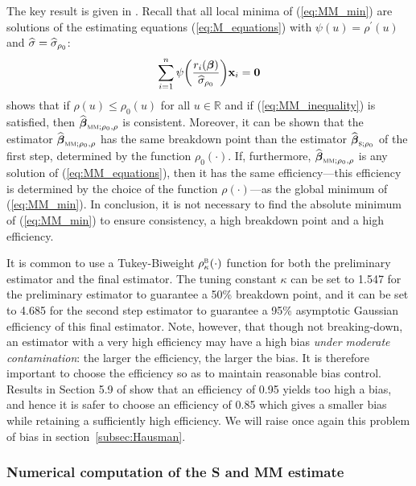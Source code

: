 The key result is given in \citet{yohai:1987}. Recall that all local minima of
(\ref{eq:MM_min}) are solutions of the estimating equations
(\ref{eq:M_equations}) with $\psi(u) = \rho^{\prime}(u)$ and $\widehat{\sigma} =
\widehat{\sigma}_{\rho_{0}}$:
%
\begin{equation}\label{eq:MM_equations}
    \sum_{i=1}^{n} \psi\left(\frac{r_{i}(\boldsymbol\beta)}{\sthat{\sigma}_{\rho_{0}}}\right)
    \stvec{x}_{i} = \stvec{0}
\end{equation}
%
\citeauthor{yohai:1987} shows that if $\rho(u) \leq \rho_{0}(u)$ for all $u \in
\mathbb{R}$ and if (\ref{eq:MM_inequality}) is satisfied, then
$\sthat{\boldsymbol\beta}_{\stsc{MM};\rho_{0},\rho}$ is consistent. Moreover,
it can be shown that the  estimator
$\sthat{\boldsymbol\beta}_{\stsc{MM};\rho_{0},\rho}$ has the same breakdown
point than the  estimator
$\sthat{\boldsymbol\beta}_{\stsc{S};\rho_{0}}$ of the first step, determined by
the function $\rho_{0}(\cdot)$. If, furthermore,
$\sthat{\boldsymbol\beta}_{\stsc{MM};\rho_{0},\rho}$ is any solution of
(\ref{eq:MM_equations}), then it has the same efficiency---this efficiency is
determined by the choice of the function $\rho(\cdot)$---as the global minimum
of (\ref{eq:MM_min}). In conclusion, it is not necessary to find the absolute
minimum of (\ref{eq:MM_min}) to ensure consistency, a high breakdown point and
a high efficiency.

It is common to use a Tukey-Biweight $\rho_{\kappa}^{\stsc{B}}(\cdot)$ function
for both the preliminary  estimator and the final  estimator.
The tuning constant $\kappa$ can be set to 1.547 for the preliminary 
estimator to guarantee a 50\% breakdown point, and it can be set to 4.685 for
the second step  estimator to guarantee a 95\% asymptotic Gaussian
efficiency of this final estimator. Note, however, that though not
breaking-down, an  estimator with a very high efficiency may have a
high bias \emph{under moderate contamination}: the larger the efficiency, the
larger the bias. It is therefore important to choose the efficiency so as to
maintain reasonable bias control. Results in Section 5.9 of
\citet{maronna:etal:2006} show that an efficiency of 0.95 yields too high a
bias, and hence it is safer to choose an efficiency of 0.85 which gives a
smaller bias while retaining a sufficiently high efficiency. We will raise once
again this problem of bias in section~\ref{subsec:Hausman}.

\subsubsection{Numerical computation of the S and MM estimate}

